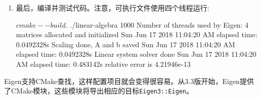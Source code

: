 \begin{enumerate}
\begin{codebox}[cmake]
if(BLAS_FOUND)
  message(STATUS "Eigen will use some subroutines from BLAS.")
  message(STATUS "See: http://eigen.tuxfamily.org/dox-devel/TopicUsingBlasLapack.html")
  target_compile_definitions(linear-algebra
    PRIVATE
        EIGEN_USE_BLAS
    )
  target_link_libraries(linear-algebra
    PUBLIC
        ${BLAS_LIBRARIES}
    )
else()
    message(STATUS "BLAS not found. Using Eigen own functions")
endif()
\end{codebox}

\item 最后，我们链接到\texttt{Eigen3::Eigen}和\texttt{OpenMP::OpenMP\_CXX}目标。这就可以设置所有必要的编译标示和链接标志:

\begin{codebox}[cmake]
target_link_libraries(linear-algebra
  PUBLIC
    Eigen3::Eigen
    OpenMP::OpenMP_CXX
  ) 
\end{codebox}

\item 开始配置:

\begin{codebox}[shell]
$ mkdir -p build
$ cd build
$ cmake ..
-- ...
-- Found OpenMP_CXX: -fopenmp (found version "4.5")
-- Found OpenMP: TRUE (found version "4.5")
-- Eigen3 v3.3.4 found in /usr/include/eigen3
-- ...
-- Found BLAS: /usr/lib/libblas.so
-- Eigen will use some subroutines from BLAS.
-- See: http://eigen.tuxfamily.org/dox-devel/TopicUsingBlasLapack.html
\end{codebox}

\item 最后，编译并测试代码。注意，可执行文件使用四个线程运行:

\begin{codebox}[shell]
$ cmake --build .
$ ./linear-algebra 1000
Number of threads used by Eigen: 4
matrices allocated and initialized Sun Jun 17 2018 11:04:20 AM
elapsed time: 0.0492328s
Scaling done, A and b saved Sun Jun 17 2018 11:04:20 AM
elapsed time: 0.0492328s
Linear system solver done Sun Jun 17 2018 11:04:20 AM
elapsed time: 0.483142s
relative error is 4.21946e-13
\end{codebox}

\end{enumerate}


Eigen支持CMake查找，这样配置项目就会变得很容易。从3.3版开始，Eigen提供了CMake模块，这些模块将导出相应的目标\texttt{Eigen3::Eigen}。

